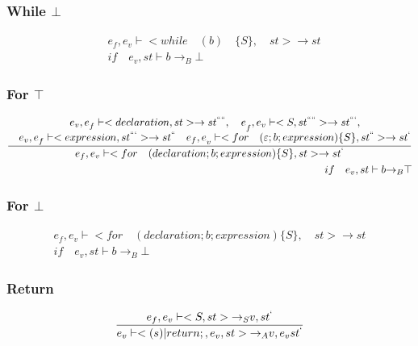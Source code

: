 \subsubsection{While $\bot$}
\begin{align*}
	&{ e }_{ f },{ e }_{ v }\vdash <while\quad (b)\quad \{S\},\quad st>\rightarrow st\\
	&if\quad { e }_{ v },st\vdash b{ \rightarrow  }_{ B }\bot
\end{align*}

\subsubsection{For $\top$}
\begin{align*}
	\frac { \quad \begin{matrix} { { e }_{ v }{ ,e }_{ f }\vdash <declaration,{ st }>\rightarrow { st }^{ ```` },\quad e }_{ f },{ e }_{ v }\vdash <{ S },{ st }^{ ```` }>\rightarrow { st }^{ ``` }, \\ { e }_{ v }{ ,e }_{ f }\vdash <expression,{ st }^{ ``` }>\rightarrow { st }^{ `` }\quad { { e }_{ f },e }_{ v }\vdash <for\quad (\varepsilon ;b;expression)\{ S\} ,{ st }^{ `` }>\rightarrow { st }^{ ` } \end{matrix} }{ { e }_{ f },{ e }_{ v }\vdash <for\quad (declaration;b;expression)\{ S\} ,st>\rightarrow { st }^{ ` } } \\ if\quad { e }_{ v },st\vdash b{ \rightarrow  }_{ B }\top  
\end{align*}


\subsubsection{For $\bot$}
\begin{align*}
	{ e }_{ f },{ e }_{ v }\vdash <for\quad (declaration;b;expression)\{ S\} ,\quad st>\rightarrow st\\ if\quad { e }_{ v },st\vdash b{ \rightarrow  }_{ B }\bot 
\end{align*}

\subsubsection{Return}
\begin{equation}
	\frac { { e }_{ f },{ e }_{ v }\vdash <{ S },st>{ \rightarrow  }_{ S }v,{ st }^{ ` } }{ { e }_{ v }\vdash <(s)|return;,{ e }_{ v },st>{ \rightarrow  }_{ A }v,{ e }_{ v }{ st }^{ ` } } 
\end{equation}


